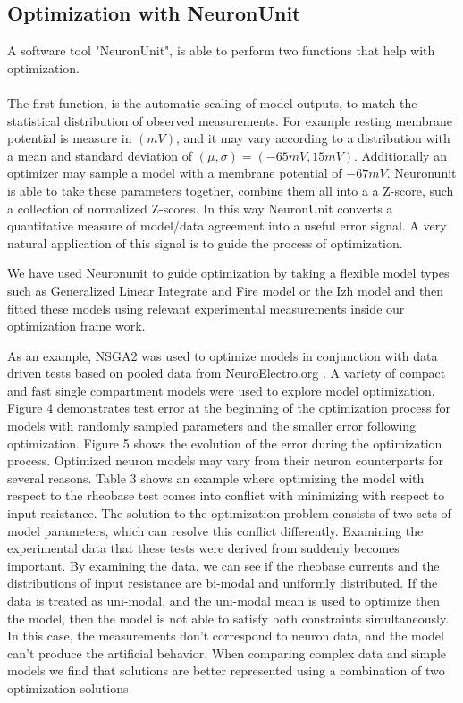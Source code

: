 \subsection{Optimization with NeuronUnit}
A software tool "NeuronUnit", is able to perform two functions that help with optimization.\\
\\
The first function, is the automatic scaling of model outputs, to match the statistical distribution of observed measurements.%
%
For example resting membrane potential is measure in $(mV)$, and it may vary according to a distribution with a mean and standard deviation of $(\mu,\sigma)=(-65mV,15mV)$. Additionally an optimizer may sample a model with a membrane potential of $-67mV$. Neuronunit is able to take these parameters together, combine them all into a a Z-score, such a collection of normalized Z-scores. In this way NeuronUnit converts a quantitative measure of model/data agreement into a useful error signal. A very natural application of this signal is to guide the process of optimization.\newline 

We have used Neuronunit to guide optimization by taking a flexible model types such as Generalized Linear Integrate and Fire model\cite{teeter2018generalized} or the Izh model and then fitted these models using relevant experimental measurements inside our optimization frame work.

As an example, NSGA2 was used to optimize models in conjunction with data driven tests based on pooled data from NeuroElectro.org \cite{tripathy2014neuroelectro}. A variety of compact and fast single compartment models were used to explore model optimization. Figure 4 demonstrates test error at the beginning of the optimization process for models with randomly sampled parameters and the smaller error following optimization. Figure 5 shows the evolution of the error during the optimization process. \newline
\newline
Optimized neuron models may vary from their neuron counterparts for several reasons. Table 3 shows an example where optimizing the model with respect to the rheobase test comes into conflict with minimizing with respect to input resistance. The solution to the optimization problem consists of two sets of model parameters, which can resolve this conflict differently. Examining the experimental data that these tests were derived from suddenly becomes important. By examining the data, we can see if the rheobase currents and the distributions of input resistance are bi-modal and uniformly distributed. If the data is treated as uni-modal, and the uni-modal mean is used to optimize then the model, then the model is not able to satisfy both constraints simultaneously. In this case, the measurements don’t correspond to neuron data, and the model can’t produce the artificial behavior. When comparing complex data and simple models we find that solutions are better represented using a combination of two optimization solutions.\newline
\newline

